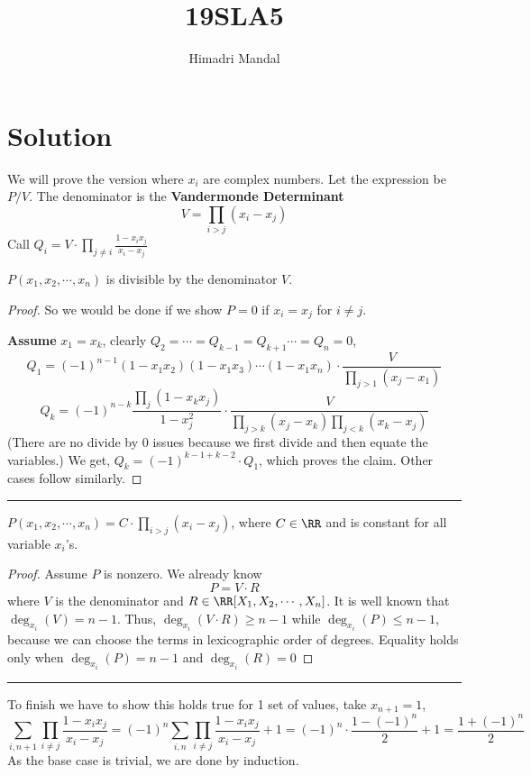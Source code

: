 \documentclass[11pt]{scrartcl}
\title{19SLA5}
\author{Himadri Mandal}
\begin{document}
\maketitle

\section{Solution}
\begin{soln}
  We will prove the version where $x_i$ are complex numbers. Let the expression be $P/V$.
  The denominator is the \textbf{Vandermonde Determinant}
    \[ V = \prod_{i > j} (x_i - x_j) \]
  Call $Q_i = V \cdot \prod_{j \neq i} \frac{1 - x_ix_j}{x_i - x_j}$
\begin{claim*}
    $P(x_1,x_2,\cdots,x_n)$ is divisible by the denominator $V$. 
  \end{claim*}
  \begin{proof}
        So we would be done if we show $P = 0$ if $x_i = x_j$ for $i \neq j$.
    
    \textbf{Assume} $x_1 = x_k$, 
    clearly $Q_2 = \cdots = Q_{k-1} = Q_{k+1} \cdots = Q_n = 0$,
    \[ Q_1 = (-1)^{n-1}(1-x_1x_2)(1-x_1x_3)\cdots(1 - x_1x_n)\cdot \frac{V}{\prod_{j > 1} (x_j - x_1)}\]
    \[ Q_k = (-1)^{n-k}\frac{\prod_{j} (1 - x_kx_j)}{1-x_j^2}\cdot \frac{V}{\prod_{j > k} (x_j - x_k) \prod_{j < k}(x_k - x_j)} \]
    (There are no divide by 0 issues because we first divide and then equate the variables.) 
    We get, $Q_k = (-1)^{k-1+k-2} \cdot Q_1$, which proves the claim. Other cases follow similarly.
  \end{proof}
  \hrule

  \bigskip
  \begin{claim*}
    $P(x_1,x_2,\cdots,x_n) = C \cdot \prod_{i > j} (x_i - x_j)$, where $C \in \RR$ and is constant for
    all variable $x_i$'s.
  \end{claim*}
  \begin{proof}
    Assume $P$ is nonzero. We already know 
    \[ P = V \cdot R \]
    where $V$ is the denominator and $R \in \RR[X_1,X_2,\cdots,X_n]$. It is well known that $\deg_{x_i}(V) = n-1$.
    Thus, $\deg_{x_i}(V \cdot R) \geq n-1$ while $\deg_{x_i}(P) \leq n-1$, because we can choose the terms
    in lexicographic order of degrees. Equality holds only when
    $\deg_{x_i}(P) = n-1$ and $\deg_{x_i}(R) = 0$
  \end{proof}   
  \hrule

  \bigskip
  \newpage
  To finish we have to show this holds true for 1 set of values, take $x_{n+1} = 1$,
  \[ \sum_{i,n+1} \prod_{i \neq j} \frac{1 - x_ix_j}{x_i - x_j} = 
  (-1)^n\sum_{i,n}\prod_{i \neq j} \frac{1 - x_ix_j}{x_i-x_j} + 1 =
  (-1)^n \cdot \frac{1 - (-1)^n}{2} + 1 = \frac{1+(-1)^n}{2}
  \]
  As the base case is trivial, we are done by induction. 
\end{soln}
\end{document}
